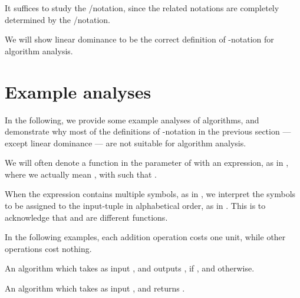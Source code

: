 \documentclass[b5paper, english, oneside]{memoir}
\begin{document}
\begin{note}
It suffices to study the \-/notation, since the related notations are completely determined by the \-/notation. 
\end{note}

We will show linear dominance  to be the correct definition of -notation for algorithm analysis.

\section{Example analyses}

In the following, we provide some example analyses of algorithms, and demonstrate why most of the definitions of -notation in the previous section --- except linear dominance --- are not suitable for algorithm analysis.

\begin{note}
We will often denote a function in the parameter of  with an expression, as in , where we actually mean , with  such that . 

When the expression contains multiple symbols, as in , we interpret the symbols to be assigned to the input-tuple in alphabetical order, as in . This is to acknowledge that  and  are different functions.
\end{note}

\begin{note}
In the following examples, each addition operation  costs one unit, while other operations cost nothing.
\end{note}

\begin{algorithm}
\caption{An algorithm which takes as input , and outputs , if , and  otherwise.}
\label{alg:ConstantComplexity}
\begin{algorithmic}[1]
\State 
\If {}
  \For {}
    \State 
  \EndFor
\EndIf
\State \Return 
\EndProcedure
\end{algorithmic}
\end{algorithm}

\begin{algorithm}
\caption{An algorithm which takes as input , and returns .}
\label{alg:BasicAnalysis}
\begin{algorithmic}[1]
  \State \Return {}
\EndProcedure
\end{algorithmic}
\end{algorithm}
\end{document}
